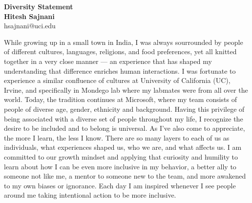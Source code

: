 \documentclass[a4papert]{article}
\begin{document}

\begin{center}
{\LARGE \textbf{Diversity Statement}} \\[.3in]
{\large  \textbf{Hitesh Sajnani}} \\
{\small hsajnani@uci.edu}
\end{center}
\pagestyle{fancy}
\lhead{\textcolor{black}{\it Hitesh Sajnani}}
\rhead{\textcolor{black}{\thepage/\pageref{LastPage}}}






While growing up in a small town in India, I was always sourrounded by people of different cultures, languages, religions, and food preferences, yet all knitted together in a very close manner --- an experience that has shaped my understanding that difference enriches human interactions. I was fortunate to experience a similar confluence of cultures at University of California (UC), Irvine, and specifically in Mondego lab where my labmates were from all over the world. Today, the tradition continues at Microsoft, where my team consists of people of diverse age, gender, ethnicity and background.  Having this privilege of being associated with a diverse set of people throughout my life, I recognize the desire to be included and to belong is universal. As I’ve also come to appreciate, the more I learn, the less I know. There are so many layers to each of us as individuals, what experiences shaped us, who we are, and what affects us.  I am committed to our growth mindset and applying that curiosity and humility to learn about how I can be even more inclusive in my behavior, a better ally to someone not like me, a mentor to someone new to the team, and more awakened to my own biases or ignorance. Each day I am inspired whenever I see people around me taking intentional action to be more inclusive. 
\end{document}
